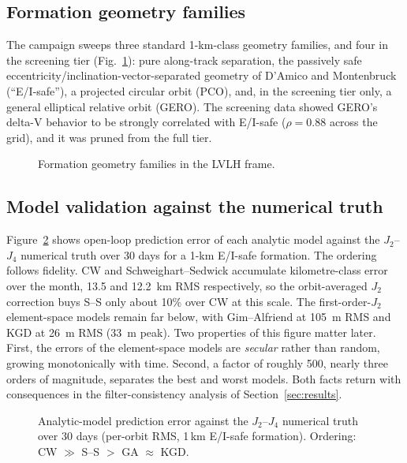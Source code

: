 \subsection{Formation geometry families}

The campaign sweeps three standard 1-km-class geometry families, and four in
the screening tier (Fig.~\ref{fig:geometry}): pure along-track separation,
the passively safe eccentricity/inclination-vector-separated geometry of
D'Amico and Montenbruck \cite{damico2006proximity} (``E/I-safe''), a
projected circular orbit (PCO), and, in the screening tier only, a general
elliptical relative orbit (GERO). The screening data showed GERO's delta-V
behavior to be strongly correlated with E/I-safe ($\rho = 0.88$ across the
grid), and it was pruned from the full tier.

\begin{figure}[t]
  \centering
  \caption{Formation geometry families in the LVLH frame.}
  \label{fig:geometry}
\end{figure}

\subsection{Model validation against the numerical truth}

Figure~\ref{fig:validation} shows open-loop prediction error of each
analytic model against the $J_2$--$J_4$ numerical truth over 30 days for a
1-km E/I-safe formation. The ordering follows fidelity. CW and
Schweighart--Sedwick accumulate kilometre-class error over the month, 13.5
and 12.2~km RMS respectively, so the orbit-averaged $J_2$ correction buys
S--S only about 10\% over CW at this scale. The first-order-$J_2$
element-space models remain far below, with Gim--Alfriend at 105~m RMS and
KGD at 26~m RMS (33~m peak). Two properties of this figure matter later.
First, the errors of the element-space models are \emph{secular} rather than
random, growing monotonically with time. Second, a factor of roughly 500,
nearly three orders of magnitude, separates the best and worst models. Both
facts return with consequences in the filter-consistency analysis of
Section~\ref{sec:results}.

\begin{figure}[t]
  \centering
  \caption{Analytic-model prediction error against the $J_2$--$J_4$
  numerical truth over 30 days (per-orbit RMS, 1\,km E/I-safe formation).
  Ordering: CW $\gg$ S--S $>$ GA $\approx$ KGD.}
  \label{fig:validation}
\end{figure}
